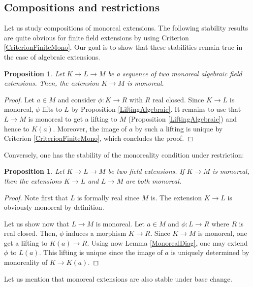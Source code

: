 \documentclass[12pt]{amsart}
\newtheorem{prop}[thm]{Proposition}
\theoremstyle{definition}
\begin{document}
\subsection{Compositions and restrictions}

Let us study compositions of monoreal extensions.
The following stability results are quite obvious for finite field extensions by using Criterion  \ref{CriterionFiniteMono}. Our goal is to show that these stabilities remain true in the case of algebraic extensions.
	
\begin{prop}\label{MonorealComposition}
	Let $K\to L\to M$ be a sequence of two monoreal algebraic field extensions.
	Then, the extension $K\to M$ is monoreal.
\end{prop}	
\begin{proof}
	Let $a\in M$ and consider $\phi :K\to R$ with $R$ real closed. Since $K\to L$ is monoreal, $\phi$ lifts to $L$ by Proposition \ref{LiftingAlgebraic}. It remains to use that $L\to M$ is monoreal to get a lifting to $M$ (Proposition \ref{LiftingAlgebraic}) and hence to $K(a)$. Moreover, the image of $a$ by such a lifting is unique by Criterion  \ref{CriterionFiniteMono}, which concludes the proof. 
\end{proof}

Conversely, one has the stability of the monoreality condition under restriction:

\begin{prop}\label{MonorealRestriction}
	Let $K\to L\to M$ be two field extensions.
	If $K\to M$ is monoreal, then the extensions $K\to L$ and
	$L\to M$ are both monoreal.
\end{prop}	
\begin{proof}
Note first that $L$ is formally real since $M$ is.
The extension $K\to L$ is obviously monoreal by definition. 

Let us show now that $L\to M$ is monoreal. 
Let $a\in M$ and $\phi:L\to R$ where $R$ is real closed. Then, $\phi$ induces a morphism $K\to R$. Since $K\to M$ is monoreal, one get a lifting to $K(a)\to R$. Using now Lemma \ref{MonorealDiag}, one may extend $\phi$ to $L(a)$. This lifting is unique since the image of $a$ is uniquely determined by monoreality of $K\to K(a)$. 
\end{proof}

Let us mention that monoreal extensions are also stable under base change.
\end{document}
